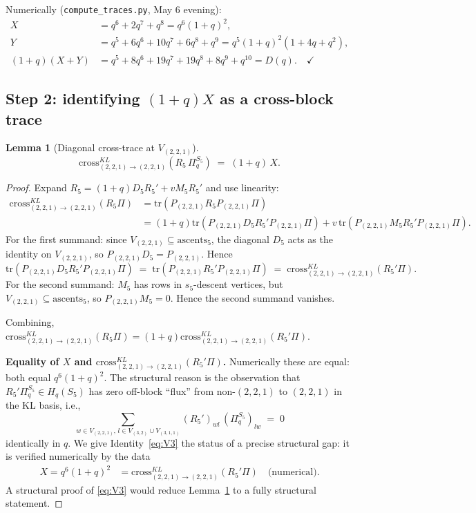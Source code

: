 \documentclass[11pt]{article}
\newtheorem{lemma}[theorem]{Lemma}
\theoremstyle{definition}
\begin{document}
Numerically (\texttt{compute\_traces.py}, May 6 evening):
\begin{align*}
X &= q^6 + 2q^7 + q^8 = q^6(1+q)^2,\\
Y &= q^5 + 6q^6 + 10q^7 + 6q^8 + q^9 = q^5(1+q)^2(1 + 4q + q^2),\\
(1+q)(X+Y) &= q^5 + 8q^6 + 19q^7 + 19q^8 + 8q^9 + q^{10} = D(q). \quad\checkmark
\end{align*}

\subsection*{Step 2: identifying $(1+q)X$ as a cross-block trace}

\begin{lemma}[Diagonal cross-trace at $V_{(2,2,1)}$]\label{lem:221-block}
\[
\mathrm{cross}_{(2,2,1) \to (2,2,1)}^{KL}(R_5\,\Pi_q^{S_5}) \;=\; (1+q)\, X.
\]
\end{lemma}

\begin{proof}
Expand $R_5 = (1+q) D_5 R_5' + v M_5 R_5'$ and use linearity:
\begin{align*}
\mathrm{cross}_{(2,2,1) \to (2,2,1)}^{KL}(R_5 \Pi)
&= \mathrm{tr}(P_{(2,2,1)} R_5 P_{(2,2,1)} \Pi)\\
&= (1+q) \mathrm{tr}(P_{(2,2,1)} D_5 R_5' P_{(2,2,1)} \Pi) + v\, \mathrm{tr}(P_{(2,2,1)} M_5 R_5' P_{(2,2,1)} \Pi).
\end{align*}
For the first summand: since $V_{(2,2,1)} \subseteq \mathrm{ascents}_5$, the
diagonal $D_5$ acts as the identity on $V_{(2,2,1)}$, so
$P_{(2,2,1)} D_5 = P_{(2,2,1)}$. Hence
\[
\mathrm{tr}(P_{(2,2,1)} D_5 R_5' P_{(2,2,1)} \Pi) \;=\; \mathrm{tr}(P_{(2,2,1)} R_5' P_{(2,2,1)} \Pi) \;=\; \mathrm{cross}_{(2,2,1) \to (2,2,1)}^{KL}(R_5' \Pi).
\]
For the second summand: $M_5$ has rows in $s_5$-descent vertices, but
$V_{(2,2,1)} \subseteq \mathrm{ascents}_5$, so $P_{(2,2,1)} M_5 = 0$. Hence
the second summand vanishes.

Combining, $\mathrm{cross}_{(2,2,1) \to (2,2,1)}^{KL}(R_5 \Pi) = (1+q) \mathrm{cross}_{(2,2,1) \to (2,2,1)}^{KL}(R_5' \Pi)$.

\smallskip\noindent
\textbf{Equality of $X$ and $\mathrm{cross}_{(2,2,1) \to (2,2,1)}^{KL}(R_5' \Pi)$.}
Numerically these are equal: both equal $q^6(1+q)^2$. The structural reason
is the observation that $R_5' \Pi_q^{S_5} \in H_q(S_5)$ has zero off-block
``flux'' from non-$(2,2,1)$ to $(2,2,1)$ in the KL basis, i.e.,
\begin{equation}\label{eq:V3}\tag{V3}
\sum_{w \in V_{(2,2,1)},\, l \in V_{(3,2)} \cup V_{(3,1,1)}} (R_5')_{wl}\,(\Pi_q^{S_5})_{lw} \;=\; 0
\end{equation}
identically in $q$. We give Identity~\eqref{eq:V3} the status of a precise structural
gap: it is verified numerically by the data
\begin{align*}
X = q^6(1+q)^2 &= \mathrm{cross}_{(2,2,1) \to (2,2,1)}^{KL}(R_5' \Pi) \quad\text{(numerical)}.
\end{align*}
A structural proof of \eqref{eq:V3} would reduce Lemma~\ref{lem:221-block} to a
fully structural statement.
\end{proof}
\end{document}
